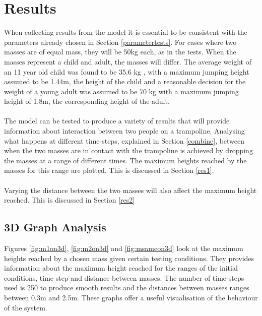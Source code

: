 \section{Results}\label{results}

\noindent When collecting results from the model it is essential to be consistent with the parameters already chosen in Section \ref{parametertests}. For cases where two masses are of equal mass, they will be 50kg each, as in the tests. When the masses represent a child and adult, the masses will differ. The average weight of an 11 year old child was found to be 35.6 kg \cite{childweight}, with a maximum jumping height assumed to be 1.44m, the height of the child \cite{childweight} and a reasonable decision for the weight of a young adult was assumed to be 70 kg with a maximum jumping height of 1.8m, the corresponding height of the adult.
\\
\\
\noindent The model can be tested to produce a variety of results that will provide information about interaction between two people on a trampoline. Analysing what happens at different time-steps, explained in Section \ref{combine}, between when the two masses are in contact with the trampoline is achieved by dropping the masses at a range of different times. The maximum heights reached by the masses for this range are plotted. This is discussed in Section \ref{res1}.
\\
\\
\noindent Varying the distance between the two masses will also affect the maximum height reached. This is discussed in Section \ref{res2}

\subsection{3D Graph Analysis}\label{3d}
\noindent Figures \ref{fig:m1on3d}, \ref{fig:m2on3d} and \ref{fig:msameon3d} look at the maximum heights reached by a chosen mass given certain testing conditions. They provides information about the maximum height reached for the ranges of the initial conditions, time-step and distance between masses. The number of time-steps used is 250 to produce smooth results and the distances between masses ranges between 0.3m and 2.5m. These graphs offer a useful visualisation of the behaviour of the system.





